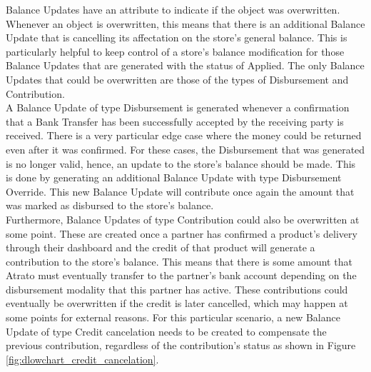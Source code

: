 Balance Updates have an attribute to indicate if the object was overwritten. Whenever an object is overwritten, this means that there is an additional Balance Update that is cancelling its affectation on the store’s general balance. This is particularly helpful to keep control of a store’s balance modification for those Balance Updates that are generated with the status of Applied. The only Balance Updates that could be overwritten are those of the types of Disbursement and Contribution.\\

A Balance Update of type Disbursement is generated whenever a confirmation that a Bank Transfer has been successfully accepted by the receiving party is received. There is a very particular edge case where the money could be returned even after it was confirmed. For these cases, the Disbursement that was generated is no longer valid, hence, an update to the store’s balance should be made. This is done by generating an additional Balance Update with type Disbursement Override. This new Balance Update will contribute once again the amount that was marked as disbursed to the store’s balance.\\

Furthermore, Balance Updates of type Contribution could also be overwritten at some point. These are created once a partner has confirmed a product’s delivery through their dashboard and the credit of that product will generate a contribution to the store’s balance. This means that there is some amount that Atrato must eventually transfer to the partner’s bank account depending on the disbursement modality that this partner has active. These contributions could eventually be overwritten if the credit is later cancelled, which may happen at some points for external reasons. For this particular scenario, a new Balance Update of type Credit cancelation needs to be created to compensate the previous contribution, regardless of the contribution’s status as shown in Figure \ref{fig:dlowchart_credit_cancelation}.

